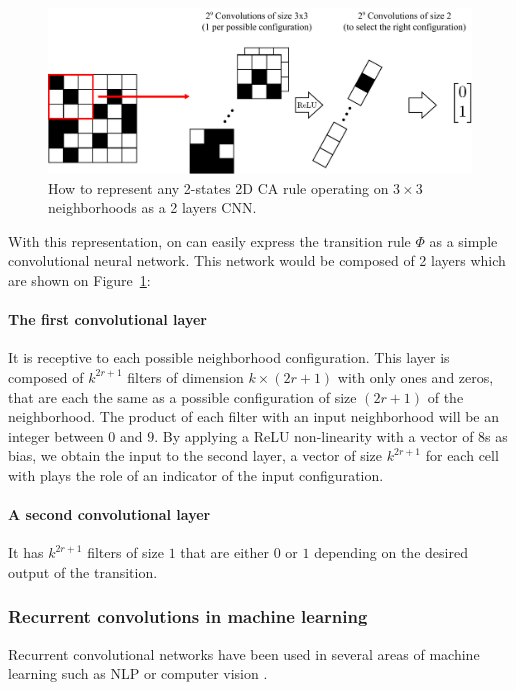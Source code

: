 \begin{figure}[htbp]
  \centering
  \includegraphics[width=.9\linewidth]{figures/global_schema}
  \caption{\label{fig:global_schema}How to represent any 2-states 2D CA rule
    operating on $3\times 3$ neighborhoods as a 2 layers CNN.}
\end{figure}


With this representation, on can easily express the transition rule $\Phi$ as a
simple convolutional neural network. This network would be composed of 2 layers
which are shown on Figure~\ref{fig:global_schema}:

\paragraph{The first convolutional layer}It is receptive to each possible
neighborhood configuration. This layer is composed of $k^{2r + 1}$ filters of
dimension $k\times (2r + 1)$ with only ones and zeros, that are each the same as
a possible configuration of size $(2r+1)$ of the neighborhood. The product of
each filter with an input neighborhood will be an integer between $0$ and $9$.
By applying a ReLU non-linearity with a vector of 8s as bias, we obtain the
input to the second layer, a vector of size $k^{2r + 1}$ for each cell with
plays the role of an indicator of the input configuration.

\paragraph{A second convolutional layer} It has $k^{2r + 1}$ filters of size $1$ that
are either $0$ or $1$ depending on the desired output of the transition.

\subsubsection{Recurrent convolutions in machine learning}

Recurrent convolutional networks have been used in several areas of machine
learning such as NLP or computer vision
\parencite{pinheiroRecurrentConvolutionalNeural2014,
  laiRecurrentConvolutionalNeural2015}.

